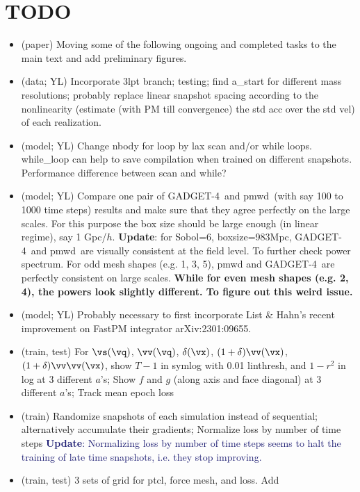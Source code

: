 \documentclass[modern, trackchanges, dvipsnames]{aastex631}
\newcommand{\pmwd}{{\usefont{T1}{nova}{m}{sl}pmwd}}
\newcommand{\GADGET}{{{\fontsize{10pt}{12pt}\selectfont GADGET}-4}}
\newcommand{\YZ}[1]{\textcolor{MidnightBlue}{#1}}
\begin{document}
\section*{TODO}
\begin{itemize}
\item (paper) Moving some of the following ongoing and completed tasks
  to the main text and add preliminary figures.
\item (data; YL) Incorporate 3lpt branch; testing; find a\_start for
  different mass resolutions; probably replace linear snapshot spacing
  according to the nonlinearity (estimate (with PM till convergence) the
  std acc over the std vel) of each realization.
\item (model; YL) Change nbody for loop by lax scan and/or while loops.
  while\_loop can help to save compilation when trained on different
  snapshots. Performance difference between scan and while?
\item (model; YL) Compare one pair of \GADGET\ and \pmwd\ (with say 100 to 1000 time
    steps) results and make sure that they agree perfectly on the large
    scales. For this purpose the box size should be large enough (in
    linear regime), say 1 Gpc/$h$.\newline
    \textbf{Update}: for Sobol=6, boxsize=983Mpc, \GADGET\ and \pmwd\ are visually
    consistent at the field level. To further check power spectrum. For odd mesh
    shapes (e.g. 1, 3, 5), pmwd and \GADGET\ are perfectly consistent on large
    scales. \textbf{While for even mesh shapes (e.g. 2, 4), the powers look
    slightly different. To figure out this weird issue.}
\item (model; YL) Probably necessary to first incorporate List \& Hahn's
  recent improvement on FastPM integrator arXiv:2301:09655.
\item (train, test) For $\vs(\vq)$, $\vv(\vq)$, $\delta(\vx)$,
  $(1+\delta)\vv(\vx)$, $(1+\delta)\vv\vv(\vx)$, show $T - 1$ in symlog
  with 0.01 linthresh, and $1-r^2$ in log at 3 different $a$'s; Show $f$
  and $g$ (along axis and face diagonal) at 3 different $a$'s; Track
  mean epoch loss
\item (train) Randomize snapshots of each simulation instead of
  sequential; alternatively accumulate their gradients; Normalize loss
  by number of time steps\newline
  \YZ{\textbf{Update}: Normalizing loss by number of time steps seems to halt
  the training of late time snapshots, i.e. they stop improving.}
\item (train, test) 3 sets of grid for ptcl, force mesh, and loss. Add

\end{itemize}
\end{document}
